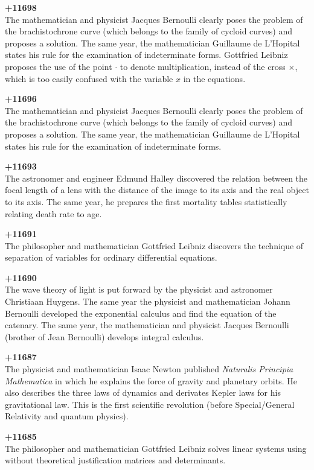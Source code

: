 \textbf{+11698}\\
The mathematician and physicist Jacques Bernoulli clearly poses the problem of the brachistochrone curve (which belongs to the family of cycloid curves) and proposes a solution. The same year, the mathematician Guillaume de L'Hopital states his rule for the examination of indeterminate forms. Gottfried Leibniz proposes the use of the point $\cdot$ to denote multiplication, instead of the cross $\times$, which is too easily confused with the variable $x$ in the equations.

\textbf{+11696}\\
The mathematician and physicist Jacques Bernoulli clearly poses the problem of the brachistochrone curve (which belongs to the family of cycloid curves) and proposes a solution. The same year, the mathematician Guillaume de L'Hopital states his rule for the examination of indeterminate forms.

\textbf{+11693}\\
The astronomer and engineer Edmund Halley discovered the relation between the focal length of a lens with the distance of the image to its axis and the real object to its axis. The same year, he prepares the first mortality tables statistically relating death rate to age.

\textbf{+11691}\\
The philosopher and mathematician Gottfried Leibniz discovers the technique of separation of variables for ordinary differential equations.

\textbf{+11690}\\
The wave theory of light is put forward by the physicist and astronomer Christiaan Huygens. The same year the physicist and mathematician Johann Bernoulli developed the exponential calculus and find the equation of the catenary. The same year, the mathematician and physicist Jacques Bernoulli (brother of Jean Bernoulli) develops integral calculus.

\textbf{+11687}\\
The physicist and mathematician Isaac Newton published \textit{Naturalis Principia Mathematica} in which he explains the force of gravity and planetary orbits. He also describes the three laws of dynamics and derivates Kepler laws for his gravitational law. This is the first scientific revolution (before Special/General Relativity and quantum physics).

\textbf{+11685}\\
The philosopher and mathematician Gottfried Leibniz solves linear systems using without theoretical justification matrices and determinants.

